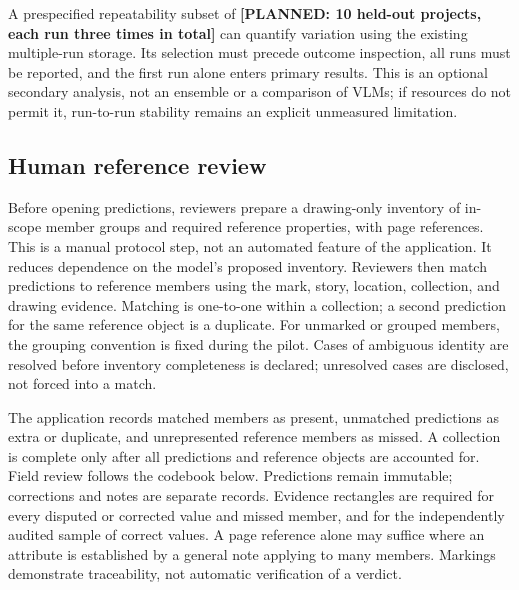 \documentclass[11pt]{article}
\newcommand{\planned}[1]{\textcolor{blue!65!black}{\textbf{[PLANNED: #1]}}}
\begin{document}
A prespecified repeatability subset of \planned{10 held-out projects, each run three times in total} can quantify variation using the existing multiple-run storage. Its selection must precede outcome inspection, all runs must be reported, and the first run alone enters primary results. This is an optional secondary analysis, not an ensemble or a comparison of VLMs; if resources do not permit it, run-to-run stability remains an explicit unmeasured limitation.

\subsection{Human reference review}
Before opening predictions, reviewers prepare a drawing-only inventory of in-scope member groups and required reference properties, with page references. This is a manual protocol step, not an automated feature of the application. It reduces dependence on the model's proposed inventory. Reviewers then match predictions to reference members using the mark, story, location, collection, and drawing evidence. Matching is one-to-one within a collection; a second prediction for the same reference object is a duplicate. For unmarked or grouped members, the grouping convention is fixed during the pilot. Cases of ambiguous identity are resolved before inventory completeness is declared; unresolved cases are disclosed, not forced into a match.

The application records matched members as present, unmatched predictions as extra or duplicate, and unrepresented reference members as missed. A collection is complete only after all predictions and reference objects are accounted for. Field review follows the codebook below. Predictions remain immutable; corrections and notes are separate records. Evidence rectangles are required for every disputed or corrected value and missed member, and for the independently audited sample of correct values. A page reference alone may suffice where an attribute is established by a general note applying to many members. Markings demonstrate traceability, not automatic verification of a verdict.
\end{document}
